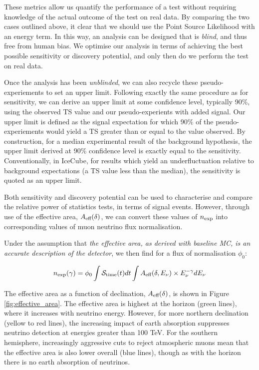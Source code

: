 These metrics allow us quantify the performance of a test without requiring knowledge of the actual outcome of the test on real data. By comparing the two cases outlined above, it clear that we should use the Point Source Likelihood with an energy term. In this way, an analysis can be designed that is \emph{blind}, and thus free from human bias. We optimise our analysis in terms of achieving the best possible sensitivity or discovery potential, and only then do we perform the test on real data. 

Once the analysis has been \emph{unblinded}, we can also recycle these pseudo-experiements to set an upper limit. Following exactly the same procedure as for sensitivity, we can derive an upper limit at some confidence level, typically 90\%, using the observed TS value and our pseudo-experients with added signal. Our upper limit is defined as the signal expectation for which 90\% of the pseudo-experiements would yield a TS greater than or equal to the value observed. By construction, for a median experimental result of the background hypothesis, the upper limit derived at 90\% confidence level is exactly equal to the sensitivity. Conventionally, in IceCube, for results which yield an underfluctuation relative to background expectations (a TS value less than the median), the sensitivity is quoted as an upper limit.

Both sensitivity and discovery potential can be used to characterise and compare the relative power of statistics tests, in terms of signal events. However, through use of the effective area,  $A_{\textup{eff}} (\delta)$, we can convert these values of $n_{\textup{exp}}$ into corresponding values of muon neutrino flux normalisation.

Under the assumption that \emph{the effective area, as derived with baseline MC, is an accurate description of the detector},  we then find for a flux of normalisation $\phi_{0}$:

\begin{equation}
n_{\textup{exp}} (\gamma) = \phi_{0} \int \mathcal{S}_{\textup{time}}(t) dt \int A_{\textup{eff}}(\delta, E_{\nu}) \times E_{\nu}^{-\gamma} dE_{\nu}
\label{eq:n_exp}
\end{equation}

The effective area as a function of declination, $A_{\textup{eff}} (\delta)$, is shown in Figure \ref{fig:effective_area}. The effective area is highest at the horizon (green lines), where it increases with neutrino energy. However, for more northern declination (yellow to red lines), the increasing impact of earth absorption suppresses neutrino detection at energies greater than 100 TeV. For the southern hemisphere, increasingly aggressive cuts to reject atmospheric muons mean that the effective area is also lower overall (blue lines), though as with the horizon there is no earth absorption of neutrinos.

